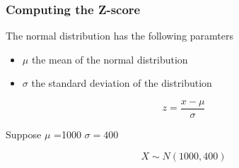 
\frametitle{Computing the Z-score}

The normal distribution has the following paramters

\begin{itemize}
\item $\mu$ the mean of the normal distribution
\item $\sigma$ the standard deviation of the distribution
\end{itemize}


\[z = \frac{x - \mu}{ \sigma}\]

Suppose $ \mu$ =1000
$\sigma=400$

\[ X \sim N(1000,400) \]


